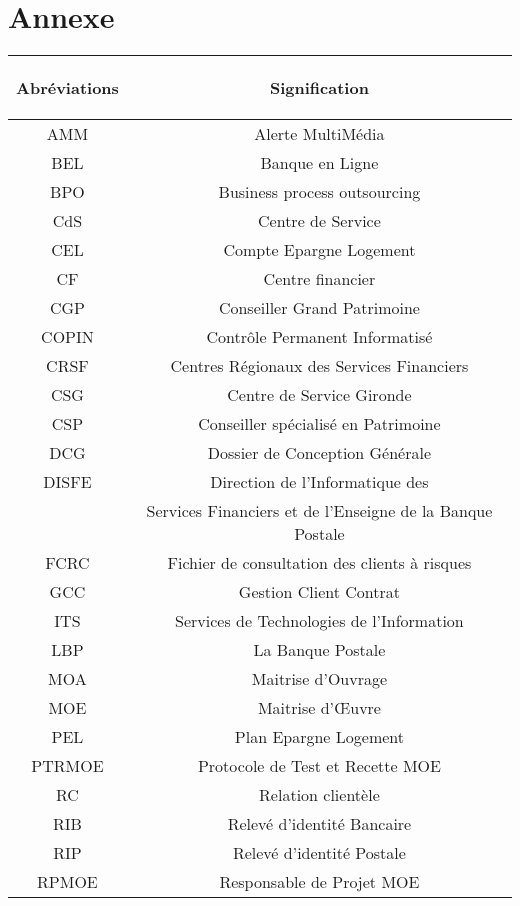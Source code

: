 \chapter*{Annexe}
\small{
\begin{center}
\begin{tabular}{|c|c|}
\hline
\begin{bf}Abréviations\end{bf}	& \begin{bf}Signification\end{bf}\\
\hline
AMM	& Alerte MultiMédia\\
BEL	& Banque en Ligne\\
BPO	& Business process outsourcing\\
CdS	& Centre de Service\\
CEL	& Compte Epargne Logement\\
CF	& Centre financier\\
CGP	& Conseiller Grand Patrimoine\\
COPIN & Contrôle Permanent Informatisé\\
CRSF	& Centres Régionaux des Services Financiers\\
CSG	& Centre de Service Gironde\\
CSP	& Conseiller spécialisé en Patrimoine\\
DCG	& Dossier de Conception Générale\\
DISFE	& Direction de l’Informatique des\\
        & Services Financiers et de l’Enseigne de la Banque Postale\\
FCRC	& Fichier de consultation des clients à risques\\
GCC	& Gestion Client Contrat\\
ITS	& Services de Technologies de l’Information\\
LBP	& La Banque Postale\\
MOA	& Maitrise d’Ouvrage\\
MOE	& Maitrise d’Œuvre\\
PEL	& Plan Epargne Logement\\
PTRMOE & Protocole de Test et Recette MOE\\
RC	& Relation clientèle\\
RIB	& Relevé d’identité Bancaire\\
RIP	& Relevé d’identité Postale\\
RPMOE & Responsable de Projet MOE\\

\end{tabular}
\end{center}}
